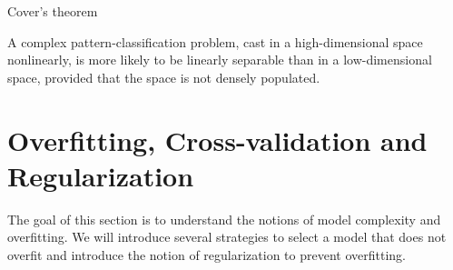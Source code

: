 \begin{parag}{Cover's theorem}
	\begin{theoreme}
    A complex pattern-classification problem, cast in a high-dimensional space nonlinearly, is more likely to be linearly separable than in a low-dimensional space, provided that the space is not densely populated.
    \end{theoreme}
\end{parag}

\section{Overfitting, Cross-validation and Regularization}
The goal of this section is to understand the notions of model complexity and overfitting. We will introduce several strategies to select a model that does not overfit and introduce the notion of regularization to prevent overfitting.

